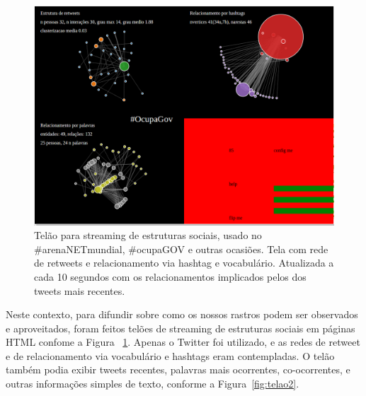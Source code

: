 \documentclass[a4paper, 11pt]{article} %
\begin{document}
\begin{figure}[H]
  \centering
    \includegraphics[width=.7\textwidth]{telao1.png}
  \caption{\small Telão para streaming de estruturas sociais, usado no \#arenaNETmundial, \#ocupaGOV e outras ocasiões. Tela com rede de retweets e relacionamento via hashtag e vocabulário. Atualizada a cada 10 segundos com os relacionamentos implicados pelos dos tweets mais recentes.}\label{fig:telao1}
\end{figure}


Neste contexto, para difundir sobre como os nossos rastros podem ser observados e aproveitados, foram feitos telões de streaming de estruturas sociais em páginas HTML confome a Figura ~\ref{fig:telao1}. Apenas o Twitter foi utilizado, e as redes de retweet e de relacionamento via vocabulário e hashtags eram contempladas. O telão também podia exibir tweets recentes, palavras mais ocorrentes, co-ocorrentes, e outras informações simples de texto, conforme a Figura~\ref{fig:telao2}.



\end{document}
